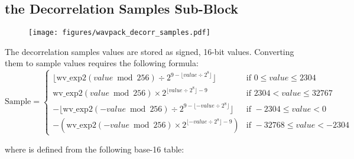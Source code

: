 \subsection{the Decorrelation Samples Sub-Block}
\label{wavpack_decorr_samples}
\begin{figure}[h]
\texttt{[image: figures/wavpack\_decorr\_samples.pdf]}
\end{figure}
\par
\noindent
The decorrelation samples values are stored as signed, 16-bit values.
Converting them to sample values requires the following formula:
\begin{equation*}
\text{Sample} =
\begin{cases}
\lfloor \text{wv\_exp2}(value \bmod{256}) \div 2 ^ {9 - \lfloor value \div 2 ^ 8 \rfloor} \rfloor & \text{if } 0 \leq value \leq 2304 \\
\text{wv\_exp2}(value \bmod{256}) \times 2 ^ {\lfloor value \div 2 ^ 8 \rfloor - 9} & \text{if } 2304 < value \leq 32767 \\
-\lfloor \text{wv\_exp2}(-value \bmod{256}) \div 2 ^ {9 - \lfloor -value \div 2 ^ 8 \rfloor} \rfloor & \text{if } -2304 \leq value < 0 \\
-(\text{wv\_exp2}(-value \bmod{256}) \times 2 ^ {\lfloor -value \div 2 ^ 8 \rfloor - 9}) & \text{if } -32768 \leq value < -2304
\end{cases}
\end{equation*}
\par
\noindent
where  is defined from the following base-16 table:
\par
\noindent
